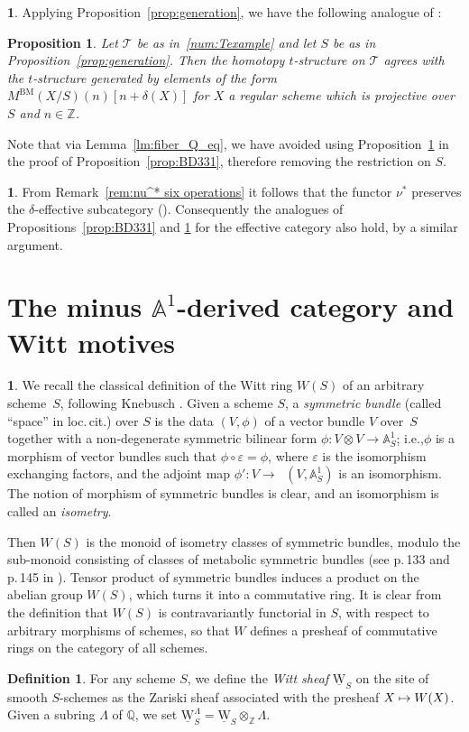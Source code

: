 \documentclass[11pt]{article}
\newcommand{\ie}{i.e.,\xspace}
\numberwithin{equation}{section}\renewcommand{\encodingdefault}{TU}
\def\mto{\mathchoice{\longmapsto}{\mapsto}{\mapsto}{\mapsto}}
\let\epsilon\varepsilon
\newcommand{\tstructure}{$t$-structure\xspace}
\newcommand{\T}{\mathscr T}
\renewcommand{\AA}{\mathbb A}
\newcommand{\uW}{\underline{\mathrm W}}
\DeclareMathOperator{\uHom}{\underline{Hom}}
\newcommand{\ZZ} {\mathbb Z}
\newcommand{\QQ} {\mathbb Q}
\newtheorem{prop}[thm]{Proposition}
\theoremstyle{remark}
\theoremstyle{definition}
\newtheorem{df}[thm]{Definition}
\newtheorem{num}[thm]{}
\numberwithin{equation}{thm}
\begin{document}
\begin{num}
Applying Proposition~\ref{prop:generation}, we have the following analogue of \cite[Th.\,2.4.3]{BD1}:
\begin{prop}
\label{prop:BD243}
Let $\T$ be as in~\ref{num:Texample} and let $S$ be as in Proposition~\ref{prop:generation}. Then the homotopy \tstructure on $\T$ agrees with the \tstructure generated by elements of the form $M^{\mathrm{BM}}(X/S)(n)[n+\delta(X)]$ for $X$ a regular scheme which is projective over $S$ and $n\in\ZZ$.
\end{prop}
Note that via Lemma~\ref{lm:fiber_Q_eq}, we have avoided using Proposition~\ref{prop:BD243} in the proof of Proposition~\ref{prop:BD331}, therefore removing the restriction on $S$.
\end{num}

\begin{num}
\label{num:eff_cat}
From Remark~\ref{rem:nu^* six operations} it follows that the functor $\nu^*$ preserves the $\delta$-effective subcategory (\cite[Def.\,2.2.1]{BD1}). Consequently the analogues of Propositions~\ref{prop:BD331} and \ref{prop:BD243} for the effective category also hold, by a similar argument.
\end{num}

\section{The minus \texorpdfstring{$\AA^1$}{A1}-derived category and Witt motives}
\label{sec:W}

\begin{num}\label{num:symm_bdl}
We recall the classical definition of the Witt ring $W(S)$ of an arbitrary scheme~$S$,
following Knebusch \cite[I, \S 5]{Kne}.
Given a scheme $S$, a \emph{symmetric bundle} (called ``space'' in loc.\,cit.)
over $S$ is the data $(V,\phi)$ of a vector bundle $V$ over~$S$
together with a non-degenerate symmetric bilinear form $\phi:V \otimes V \to \AA^1_S$;
\ie $\phi$ is a morphism of vector bundles such that $\phi \circ \epsilon=\phi$, where $\epsilon$ is the
isomorphism exchanging factors, and the adjoint map $\phi':V \to \uHom(V,\AA^1_S)$ is an isomorphism.
The notion of morphism of symmetric bundles is clear, and an isomorphism is called an \emph{isometry}.

Then $W(S)$ is the monoid of isometry classes of symmetric bundles, modulo the sub-monoid consisting of classes of metabolic symmetric bundles (see p.\,133 and p.\,145 in \cite{Kne}). Tensor product of symmetric bundles induces a product on the abelian group $W(S)$, which turns it into a commutative ring.
It is clear from the definition that $W(S)$ is contravariantly functorial in $S$, with respect to arbitrary morphisms of schemes, so that $W$ defines a presheaf of commutative rings on the category of all schemes.
\end{num}
\begin{df}\label{df:unramified_Witt}
For any scheme $S$, we define the \emph{Witt sheaf} $\uW_S$ on the site of smooth $S$-schemes as the Zariski sheaf associated with the presheaf $X \mto W(X)$.
Given a subring $\Lambda$ of $\QQ$, we set $\uW_S^\Lambda=\uW_S \otimes_\ZZ \Lambda$.
\end{df}
\end{document}
